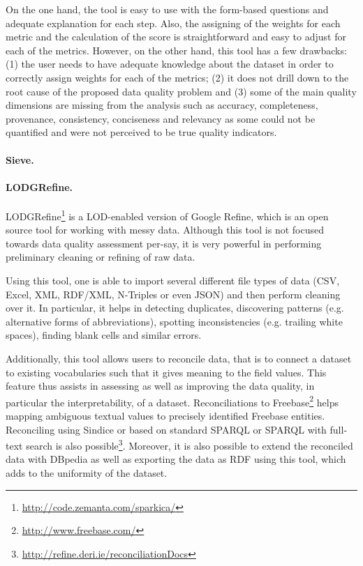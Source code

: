 On the one hand, the tool is easy to use with the form-based questions and adequate explanation for each step. 
Also, the assigning of the weights for each metric and the calculation of the score is straightforward and easy to adjust for each of the metrics. 
However, on the other hand, this tool has a few drawbacks: (1) the user needs to have adequate knowledge about the dataset in order to correctly assign weights for each of the metrics; (2) it does not drill down to the root cause of the proposed data quality problem and (3) some of the main quality dimensions are missing from the analysis such as accuracy, completeness, provenance, consistency, conciseness and relevancy as some could not be quantified and were not perceived to be true quality indicators. 

\paragraph{Sieve.}

\paragraph{LODGRefine.}
LODGRefine\footnote{\url{http://code.zemanta.com/sparkica/}} is a LOD-enabled version of Google Refine, which is an open source tool for working with messy data. 
Although this tool is not focused towards data quality assessment per-say, it is very powerful in performing preliminary cleaning or refining of raw data. 

Using this tool, one is able to import several different file types of data (CSV, Excel, XML, RDF/XML, N-Triples or even JSON) and then perform cleaning over it. 
In particular, it helps in detecting duplicates, discovering patterns (e.g. alternative forms of abbreviations), spotting inconsistencies (e.g. trailing white spaces), finding blank cells and similar errors. 

Additionally, this tool allows users to reconcile data, that is to connect a dataset to existing vocabularies such that it gives meaning to the field values. 
This feature thus assists in assessing as well as improving the data quality, in particular the interpretability, of a dataset. 
Reconciliations to Freebase\footnote{\url{http://www.freebase.com/}} helps mapping ambiguous textual values to precisely identified Freebase entities. 
Reconciling using Sindice or based on standard SPARQL or SPARQL with full-text search is also possible\footnote{\url{http://refine.deri.ie/reconciliationDocs}}.
Moreover, it is also possible to extend the reconciled data with DBpedia as well as exporting the data as RDF using this tool, which adds to the uniformity of the dataset.

